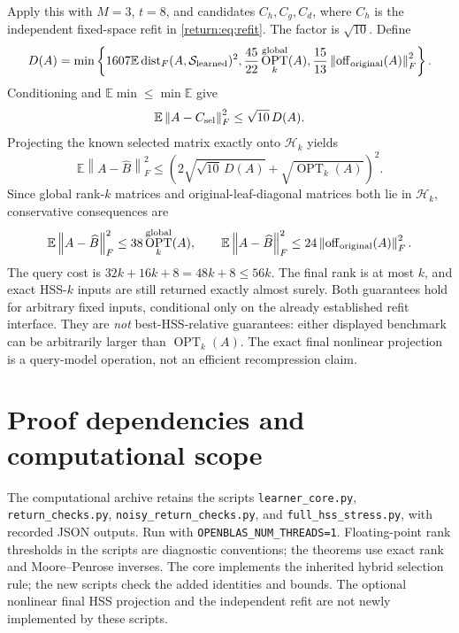 \documentclass[11pt,oneside,openany,a4paper]{book}
\numberwithin{equation}{chapter}
\theoremstyle{definition}
\theoremstyle{remark}
\newcommand{\R}{\mathbb R}\newcommand{\E}{\mathbb E}\newcommand{\Prb}{\mathbb P}\newcommand{\PP}{\mathbb P}
\newcommand{\F}[1]{\left\lVert#1\right\rVert_F}
\newcommand{\op}[1]{\left\lVert#1\right\rVert_{\rm op}}
\DeclareMathOperator{\tr}{tr}\DeclareMathOperator{\rank}{rank}
\DeclareMathOperator{\diag}{blockdiag}\DeclareMathOperator{\range}{range}
\DeclareMathOperator{\ran}{range}\DeclareMathOperator{\OPT}{OPT}
\newcommand{\HH}{\mathcal H}\newcommand{\SSS}{\mathcal S}
\begin{document}
Apply this with $M=3$, $t=8$, and candidates $C_h,C_g,C_d$, where $C_h$ is the independent fixed-space refit in \eqref{return:eq:refit}. The factor is $\sqrt{10}$. Define
\[
 D(A)=\min\left\{1607\E\dist_F(A,\SSS_{\rm learned})^2,
 \frac{45}{22}\OPT_k^{\rm global}(A),
 \frac{15}{13}\F{\operatorname{off}_{\rm original}(A)}^2\right\}.
\]
Conditioning and $\E\min\le\min\E$ give
\[
 \E\F{A-C_{\rm sel}}^2\le\sqrt{10}\,D(A).
\]
Projecting the known selected matrix exactly onto $\HH_k$ yields
\begin{equation}\label{return:eq:wrapper}
 \E\F{A-\widehat B}^2
 \le\left(2\sqrt{\sqrt{10}\,D(A)}+\sqrt{\OPT_k(A)}\right)^2.
\end{equation}
Since global rank-$k$ matrices and original-leaf-diagonal matrices both lie in $\HH_k$, conservative consequences are
\begin{equation}\label{return:eq:wrapperbenchmarks}
 \E\F{A-\widehat B}^2\le38\OPT_k^{\rm global}(A),\qquad
 \E\F{A-\widehat B}^2\le24\F{\operatorname{off}_{\rm original}(A)}^2.
\end{equation}
The query cost is $32k+16k+8=48k+8\le56k$. The final rank is at most $k$, and exact HSS-$k$ inputs are still returned exactly almost surely. Both guarantees hold for arbitrary fixed inputs, conditional only on the already established refit interface. They are \emph{not} best-HSS-relative guarantees: either displayed benchmark can be arbitrarily larger than $\OPT_k(A)$. The exact final nonlinear projection is a query-model operation, not an efficient recompression claim.

\section{Proof dependencies and computational scope}
The computational archive retains the scripts
\texttt{learner\_core.py}, \texttt{return\_checks.py},
\texttt{noisy\_return\_checks.py}, and \texttt{full\_hss\_stress.py}, with recorded JSON outputs. Run with \texttt{OPENBLAS\_NUM\_THREADS=1}. Floating-point rank thresholds in the scripts are diagnostic conventions; the theorems use exact rank and Moore--Penrose inverses. The core implements the inherited hybrid selection rule; the new scripts check the added identities and bounds. The optional nonlinear final HSS projection and the independent refit are not newly implemented by these scripts.

\endgroup

\begingroup
\let\E\relax
\newcommand{\E}{\mathbb E}
\let\PP\relax
\newcommand{\PP}{\mathbb P}
\let\R\relax
\newcommand{\R}{\mathbb R}
\let\F\relax
\newcommand{\F}[1]{\lVert #1\rVert_F}
\let\op\relax
\newcommand{\op}[1]{\lVert #1\rVert_{\rm op}}
\let\ran\relax
\newcommand{\ran}{\operatorname{range}}
\let\rank\relax
\newcommand{\rank}{\operatorname{rank}}
\let\diag\relax
\newcommand{\diag}{\operatorname{blockdiag}}
\let\dist\relax
\newcommand{\dist}{\operatorname{dist}}
\let\OPT\relax
\newcommand{\OPT}{\operatorname{OPT}}
\let\HH\relax
\newcommand{\HH}{\mathcal H}
\let\SSS\relax
\newcommand{\SSS}{\mathcal S}
\let\Id\relax
\newcommand{\Id}{\mathrm I}
\let\tr\relax
\newcommand{\tr}{\operatorname{tr}}
\let\supp\relax
\newcommand{\supp}{\operatorname{supp}}
\end{document}
